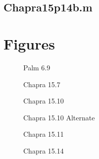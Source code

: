 \documentclass{article}
\begin{document}
\subsection{Chapra15p14b.m}
\pagebreak



\section{Figures}
\begin{figure}[h!]
\begin{center}
\caption{Palm 6.9}
\end{center}
\end{figure}

\begin{figure}[htb!]
\begin{center}
\caption{Chapra 15.7}
\end{center}
\end{figure}
\clearpage

\begin{figure}[htb!]
\begin{center}
\caption{Chapra 15.10}
\end{center}
\end{figure}

\begin{figure}[htb!]
\begin{center}
\caption{Chapra 15.10 Alternate}
\end{center}
\end{figure}
\clearpage

\begin{figure}[htb!]
\begin{center}
\caption{Chapra 15.11}
\end{center}
\end{figure}

\begin{figure}[htb!]
\begin{center}
\caption{Chapra 15.14}
\end{center}
\end{figure}
\end{document}
